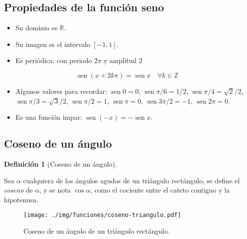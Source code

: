 \documentclass[
  a4paper,
]{scrreport}
\providecommand{\tightlist}{%
  \setlength{\itemsep}{0pt}\setlength{\parskip}{0pt}}\usepackage{longtable,booktabs,array}
\theoremstyle{plain}
\theoremstyle{definition}
\theoremstyle{plain}
\theoremstyle{plain}
\theoremstyle{definition}
\theoremstyle{definition}
\newtheorem{definition}{Definición}[chapter]
\theoremstyle{remark}
\begin{document}
\subsection{Propiedades de la función
seno}\label{propiedades-de-la-funciuxf3n-seno}

\begin{itemize}
\tightlist
\item
  Su dominio es \(\mathbb{R}\).
\item
  Su imagen es el intervalo \([-1,1]\).
\item
  Es periódica, con periodo \(2\pi\) y amplitud \(2\)
\end{itemize}

\[\operatorname{sen} (x+2k\pi)= \operatorname{sen} x\quad \forall k\in \mathbb{Z}\]

\begin{itemize}
\tightlist
\item
  Algunos valores para recordar: \(\operatorname{sen} 0=0\),
  \(\operatorname{sen} \pi/6= 1/2\),
  \(\operatorname{sen} \pi/4=\sqrt{2}/2\),
  \(\operatorname{sen} \pi/3= \sqrt{3}/2\),
  \(\operatorname{sen} \pi/2 =1\), \(\operatorname{sen} \pi = 0\),
  \(\operatorname{sen} 3\pi/2=-1\), \(\operatorname{sen} 2\pi=0\).
\item
  Es una función impar:
  \(\operatorname{sen}(-x)=-\operatorname{sen} x\).
\end{itemize}

\subsection{Coseno de un ángulo}\label{coseno-de-un-uxe1ngulo}

\begin{definition}[Coseno de un
ángulo]\protect\hypertarget{def-coseno-angulo}{}\label{def-coseno-angulo}

Sea \(\alpha\) cualquiera de los ángulos agudos de un triángulo
rectángulo, se define el \emph{coseno} de \(\alpha\), y se nota
\(\cos \alpha\), como el cociente entre el cateto contiguo y la
hipotenusa.

\end{definition}

\begin{figure}[H]

{\centering \texttt{[image: ./img/funciones/coseno-triangulo.pdf]}

}

\caption{Coseno de un ángulo de un triángulo rectángulo.}

\end{figure}%
\end{document}
